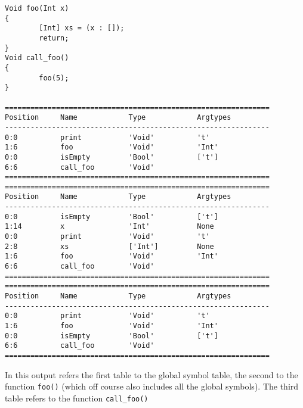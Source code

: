 \documentclass[a4paper]{article}
\begin{document}
\begin{verbatim}
Void foo(Int x)
{
        [Int] xs = (x : []);
        return;
}
Void call_foo()
{
        foo(5);
}

==============================================================
Position     Name            Type            Argtypes            
--------------------------------------------------------------
0:0          print           'Void'          't'                 
1:6          foo             'Void'          'Int'               
0:0          isEmpty         'Bool'          ['t']               
6:6          call_foo        'Void'                              
==============================================================
==============================================================
Position     Name            Type            Argtypes            
--------------------------------------------------------------
0:0          isEmpty         'Bool'          ['t']               
1:14         x               'Int'           None                
0:0          print           'Void'          't'                 
2:8          xs              ['Int']         None                
1:6          foo             'Void'          'Int'               
6:6          call_foo        'Void'                              
==============================================================
==============================================================
Position     Name            Type            Argtypes            
--------------------------------------------------------------
0:0          print           'Void'          't'                 
1:6          foo             'Void'          'Int'               
0:0          isEmpty         'Bool'          ['t']               
6:6          call_foo        'Void'                              
==============================================================
\end{verbatim}
In this output refers the first table to the global symbol table, the second to the function {\tt foo()} (which off course also includes all the global symbols). The third table refers to the function {\tt call\_foo()}
\end{document}

